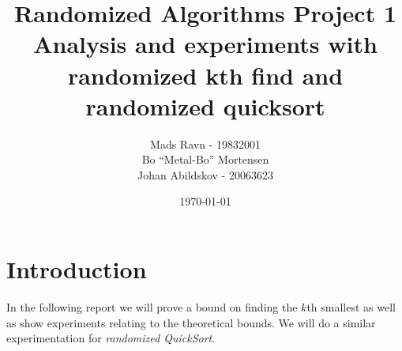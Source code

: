 \documentclass[article,a4paper,oneside]{memoir}
\newcommand{\+}[1]{\ensuremath{\boldsymbol{#1}}}
\begin{document}
\title{
Randomized Algorithms Project 1\\
Analysis and experiments with randomized kth find and randomized quicksort
}

\author{
  Mads Ravn - 19832001\\
  Bo ``Metal-Bo'' Mortensen\\
  Johan Abildskov - 20063623
}

\date{\today}

\maketitle

\newpage

\tableofcontents*


\chapter{Introduction}
In the following report we will prove a bound on finding the $k$th smallest as well as show experiments relating to the theoretical bounds. We will do a similar experimentation for \emph{randomized QuickSort}.
\end{document}
